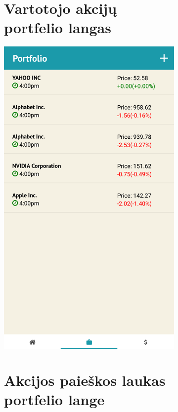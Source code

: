 \documentclass[a4paper,12pt,fleqn]{article}
\begin{document}
\begin{appendices}
\begin{figure}[t!]
	\begin{subfigure}{0.5\textwidth}
		\centering
		\tocless\section{Vartotojo akcijų portfelio langas}\label{app:priedas5}
		\includegraphics[width=0.7\linewidth]{portfolio.png}
	\end{subfigure}%
	\begin{subfigure}{0.5\textwidth}
		\centering
		\tocless\section{Akcijos paieškos laukas portfelio lange}

\end{subfigure}
\end{figure}
\end{appendices}
\end{document}
